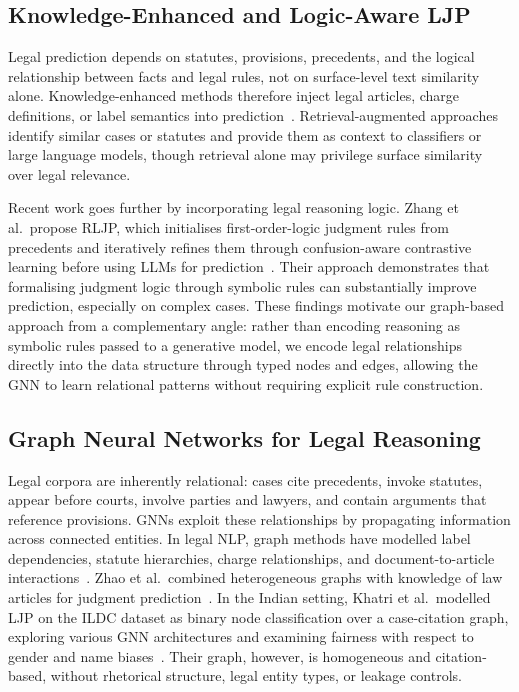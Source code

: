 \documentclass[runningheads]{llncs}
\begin{document}
\subsection{Knowledge-Enhanced and Logic-Aware LJP}
\label{subsec:knowledge-rag}

Legal prediction depends on statutes, provisions, precedents, and the logical relationship between facts and legal rules, not on surface-level text similarity alone. Knowledge-enhanced methods therefore inject legal articles, charge definitions, or label semantics into prediction~\cite{li2025kljp}. Retrieval-augmented approaches identify similar cases or statutes and provide them as context to classifiers or large language models, though retrieval alone may privilege surface similarity over legal relevance.

Recent work goes further by incorporating legal reasoning logic. Zhang et al.\ propose RLJP, which initialises first-order-logic judgment rules from precedents and iteratively refines them through confusion-aware contrastive learning before using LLMs for prediction~\cite{zhang2026rljp}. Their approach demonstrates that formalising judgment logic through symbolic rules can substantially improve prediction, especially on complex cases. These findings motivate our graph-based approach from a complementary angle: rather than encoding reasoning as symbolic rules passed to a generative model, we encode legal relationships directly into the data structure through typed nodes and edges, allowing the GNN to learn relational patterns without requiring explicit rule construction.

\subsection{Graph Neural Networks for Legal Reasoning}
\label{subsec:gnn}

Legal corpora are inherently relational: cases cite precedents, invoke statutes, appear before courts, involve parties and lawyers, and contain arguments that reference provisions. GNNs exploit these relationships by propagating information across connected entities. In legal NLP, graph methods have modelled label dependencies, statute hierarchies, charge relationships, and document-to-article interactions~\cite{xu2020distinguish,dong2021legal}. Zhao et al.\ combined heterogeneous graphs with knowledge of law articles for judgment prediction~\cite{zhao2022legal}. In the Indian setting, Khatri et al.\ modelled LJP on the ILDC dataset as binary node classification over a case-citation graph, exploring various GNN architectures and examining fairness with respect to gender and name biases~\cite{khatri2024gnnindian}. Their graph, however, is homogeneous and citation-based, without rhetorical structure, legal entity types, or leakage controls.
\end{document}
